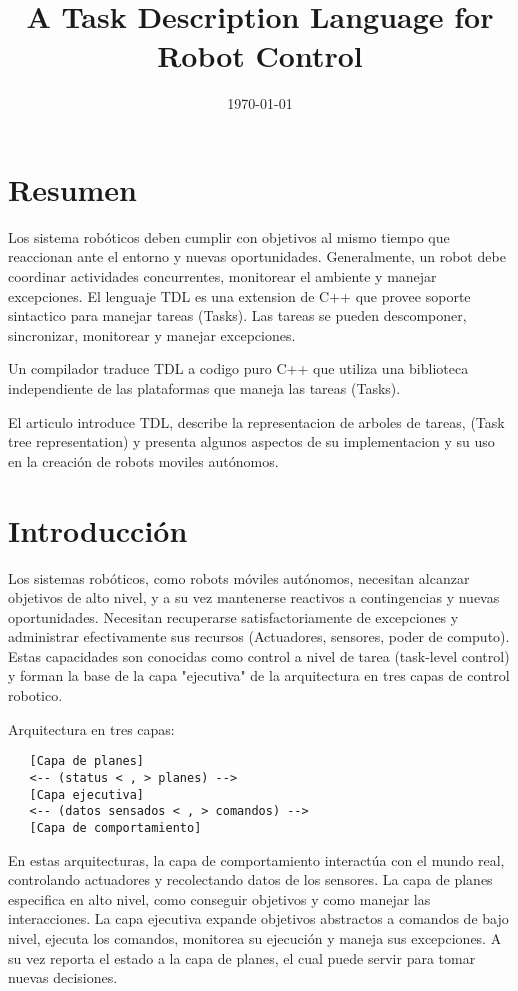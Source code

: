 \documentclass{article}
\title{A Task Description Language for Robot Control}
\date{\today}
\begin{document}
\maketitle

\section{Resumen}

Los sistema robóticos deben cumplir con objetivos al mismo tiempo que
reaccionan ante el entorno y nuevas oportunidades.
Generalmente, un robot debe coordinar actividades concurrentes, monitorear el 
ambiente y manejar excepciones.
El lenguaje TDL es una extension de C++ que provee soporte sintactico para 
manejar tareas (Tasks). 
Las tareas se pueden descomponer, sincronizar, monitorear y 
manejar excepciones.

Un compilador traduce TDL a codigo puro C++ que utiliza una biblioteca 
independiente de las plataformas que maneja las tareas (Tasks).

El articulo introduce TDL, describe la representacion de arboles de tareas, 
(Task tree representation) y presenta algunos aspectos de su implementacion 
y su uso en la creación de robots moviles autónomos.

\section{Introducción}

Los sistemas robóticos, como robots móviles autónomos, necesitan alcanzar
objetivos de alto nivel, y a su vez mantenerse reactivos a contingencias y
nuevas oportunidades.
Necesitan recuperarse satisfactoriamente de excepciones y administrar
efectivamente sus recursos (Actuadores, sensores, poder de computo).
Estas capacidades son conocidas como control a nivel de tarea
(task-level control) y forman la base de la capa "ejecutiva" de la 
arquitectura en tres capas de control robotico.

Arquitectura en tres capas:

\begin{verbatim}
   [Capa de planes]
   <-- (status < , > planes) -->
   [Capa ejecutiva]
   <-- (datos sensados < , > comandos) -->
   [Capa de comportamiento]
\end{verbatim}


En estas arquitecturas, la capa de comportamiento interactúa con el mundo real,
controlando actuadores y recolectando datos de los sensores.
La capa de planes especifica en alto nivel, como conseguir objetivos y
como manejar las interacciones.
La capa ejecutiva expande objetivos abstractos a comandos de bajo nivel,
ejecuta los comandos, monitorea su ejecución y maneja sus excepciones. A su 
vez reporta el estado a la capa de planes, el cual puede servir para tomar
nuevas decisiones.
\end{document}
